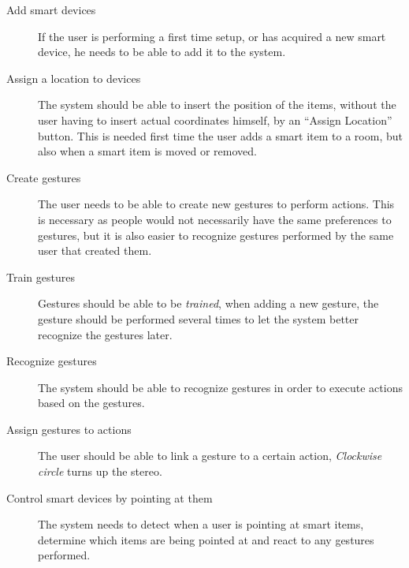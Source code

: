 \begin{description}
    \item[Add smart devices] If the user is performing a first time setup, or has acquired a new smart device, he needs to be able to add it to the system. 
    \item[Assign a location to devices] The system should be able to insert the position of the items, without the user having to insert actual coordinates himself, \eg by an ``Assign Location'' button. This is needed first time the user adds a smart item to a room, but also when a smart item is moved or removed.
    \item[Create gestures] The user needs to be able to create new gestures to perform actions. This is necessary as people would not necessarily have the same preferences to gestures, but it is also easier to recognize gestures performed by the same user that created them.
    \item[Train gestures] Gestures should be able to be \emph{trained}, \ie when adding a new gesture, the gesture should be performed several times to let the system better recognize the gestures later.  
    \item[Recognize gestures] The system should be able to recognize gestures in order to execute actions based on the gestures.
    \item[Assign gestures to actions] The user should be able to link a gesture to a certain action, \eg \textit{Clockwise circle} turns up the stereo.
    \item[Control smart devices by pointing at them] The system needs to detect when a user is pointing at smart items, determine which items are being pointed at and react to any gestures performed.
\end{description}

